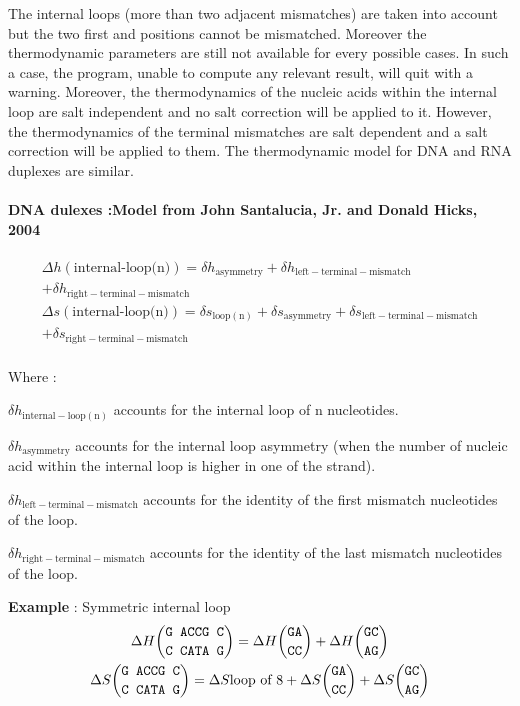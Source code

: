 \documentclass{article}
\begin{document}
The internal loops (more than two adjacent mismatches) are taken into account but the two first and positions cannot
be mismatched. Moreover the thermodynamic parameters are still not available for every possible cases.
In such a case, the program, unable to compute any relevant result, will quit with a warning.
Moreover, the thermodynamics of the nucleic acids within the internal loop are salt 
independent and no salt correction will be applied to it. However, the thermodynamics
of the terminal mismatches are salt dependent and a salt correction will be applied
to them.
The thermodynamic model for DNA and RNA duplexes are similar.

\paragraph{DNA dulexes :\textbf{Model from John Santalucia, Jr. and Donald Hicks, 2004}} 

\begin{multline*}
\Delta h {(\mbox{internal-loop(n)})} =
\delta{}h_\mathrm{asymmetry} +
\delta{}h_\mathrm{left-terminal-mismatch} \\ +
\delta{}h_\mathrm{right-terminal-mismatch}\\
\Delta s {(\mbox{internal-loop(n)})} =
\delta{}s_\mathrm{loop(n)} +
\delta{}s_\mathrm{asymmetry} +
\delta{}s_\mathrm{left-terminal-mismatch} \\ +
\delta{}s_\mathrm{right-terminal-mismatch}\\
\end{multline*}

Where :

$\delta{}h_\mathrm{internal-loop(n)}$ accounts for the internal loop of n nucleotides.

$\delta{}h_\mathrm{asymmetry}$ accounts for the internal loop asymmetry (when the number of
nucleic acid within the internal loop is higher in one of the strand).

$\delta{}h_\mathrm{left-terminal-mismatch}$ accounts for the identity of the first mismatch 
nucleotides of the loop.

$\delta{}h_\mathrm{right-terminal-mismatch}$ accounts for the identity of the last mismatch 
nucleotides of the loop.

\textbf{Example} : Symmetric internal loop
\begin{multline*}
\Delta H {\mbox{\texttt{G ACCG C}} \choose \mbox{\texttt{C CATA G}}} = 
\Delta H {\mbox{\texttt{GA}} \choose \mbox{\texttt{CC}}} +
\Delta H {\mbox{\texttt{GC}} \choose \mbox{\texttt{AG}}}\\
\Delta S {\mbox{\texttt{G ACCG C}} \choose \mbox{\texttt{C CATA G}}} = 
\Delta S {\mbox{loop of 8}} +
\Delta S {\mbox{\texttt{GA}} \choose \mbox{\texttt{CC}}} +
\Delta S {\mbox{\texttt{GC}} \choose \mbox{\texttt{AG}}}\\
\end{multline*}
\end{document}
